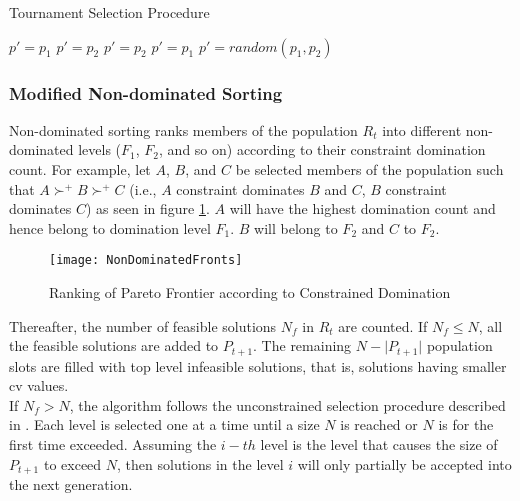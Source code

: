 \begin{algorithm}[h!]
  \caption{Tournament Selection Procedure}\label{alg:tournament_selection}
    {
        $p' = p_1$
    }
    {
        $p' = p_2$
    }
    {
        {
            $p' = p_2$
        }
        {
            $p' = p_1$
        }
    }
    {
        $p' = random(p_1, p_2)$
    }
    
  \end{algorithm}

\subsubsection{Modified Non-dominated Sorting}
Non-dominated sorting ranks members of the population $R_t$ into different non-dominated levels ($F_1$, $F_2$, and so on) according to their constraint domination count. For example, let $A$, $B$, and $C$ be selected members of the population such that $A \succ^+ B \succ^+ C$ (i.e., $A$ constraint dominates $B$ and $C$, $B$ constraint dominates $C$) as seen in figure \ref{fig:paretolevels}. $A$ will have the highest domination count and hence belong to domination level $F_1$. $B$ will belong to $F_2$ and $C$ to $F_2$. 

\begin{figure}
\centering
\texttt{[image: NonDominatedFronts]}
\caption{Ranking of Pareto Frontier according to Constrained Domination}\label{fig:paretolevels}
\end{figure}

Thereafter, the number of feasible solutions $N_f$ in $R_t$ are counted. If $N_f \leq N$, all the feasible solutions are added to  $P_{t+1}$. The remaining $N - \lvert P_{t+1} \rvert$ population slots are filled with top level infeasible solutions, that is, solutions having smaller \gls{cv} values.\\
If $N_f > N$, the algorithm follows the unconstrained selection procedure described in \parencite{Deb2013AnConstraints}. Each level is selected one at a time until a size $N$ is reached or $N$ is for the first time exceeded. Assuming the $i-th$ level is the level that causes the size of $P_{t+1}$ to exceed $N$, then solutions in the level $i$ will only partially be accepted into the next generation. 

